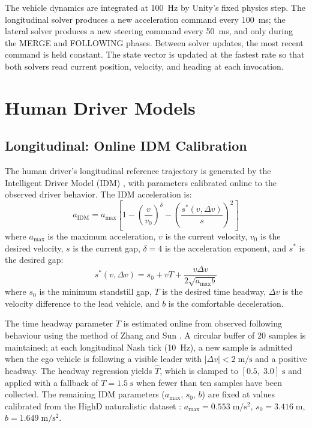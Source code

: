\documentclass[12pt,a4paper,oneside]{report}
\begin{document}
The vehicle dynamics are integrated at 100~Hz by Unity's fixed physics step. The
longitudinal solver produces a new acceleration command every 100~ms; the lateral solver
produces a new steering command every 50~ms, and only during the MERGE and FOLLOWING
phases. Between solver updates, the most recent command is held constant. The state vector
is updated at the fastest rate so that both solvers read current position, velocity, and
heading at each invocation.

\section{Human Driver Models}
\label{sec:human_driver}

\subsection{Longitudinal: Online IDM Calibration}

The human driver's longitudinal reference trajectory is generated by the Intelligent
Driver Model (IDM) \cite{treiberCongestedTrafficStates2000}, with parameters calibrated online to
the observed driver behavior. The IDM acceleration is:
\begin{equation}
a_{\text{IDM}} = a_{\max} \left[ 1 - \left( \frac{v}{v_0} \right)^\delta
- \left( \frac{s^*(v, \Delta v)}{s} \right)^2 \right]
\label{eq:idm}
\end{equation}
where $a_{\max}$ is the maximum acceleration, $v$ is the current velocity, $v_0$ is the
desired velocity, $s$ is the current gap, $\delta = 4$ is the acceleration exponent, and
$s^*$ is the desired gap:
\begin{equation}
s^*(v, \Delta v) = s_0 + v T + \frac{v \Delta v}{2\sqrt{a_{\max} b}}
\label{eq:idm_desired_gap}
\end{equation}
where $s_0$ is the minimum standstill gap, $T$ is the desired time headway, $\Delta v$ is
the velocity difference to the lead vehicle, and $b$ is the comfortable deceleration.

The time headway parameter $T$ is estimated online from observed following behaviour using
the method of Zhang and Sun \cite{zhangBayesianCalibrationIntelligent2024}. A circular buffer of 20 samples is
maintained; at each longitudinal Nash tick (10~Hz), a new sample is admitted when the
ego vehicle is following a visible leader with $|\Delta v| < 2\;\mathrm{m/s}$ and a
positive headway. The headway regression yields $\hat{T}$, which is clamped to
$[0.5,\;3.0]\;\mathrm{s}$ and applied with a fallback of $T = 1.5\;\mathrm{s}$ when
fewer than ten samples have been collected. The remaining IDM parameters ($a_{\max}$,
$s_0$, $b$) are fixed at values calibrated from the HighD naturalistic dataset
\cite{krajewskiHighDDatasetDrone2018}: $a_{\max} = 0.553\;\mathrm{m/s^2}$,
$s_0 = 3.416\;\mathrm{m}$, $b = 1.649\;\mathrm{m/s^2}$.
\end{document}

